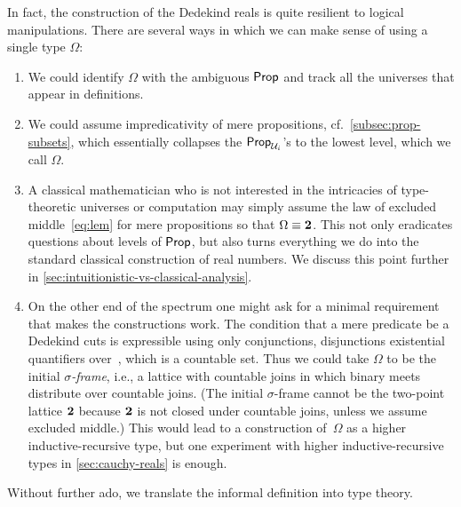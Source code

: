 In fact, the construction of the Dedekind reals is quite resilient to logical
manipulations. There are several ways in which we can make sense of using a single type
$\Omega$:
%
\begin{enumerate}

\item We could identify $\Omega$ with the ambiguous $\mathsf{Prop}$ and track all the universes
  that appear in definitions.

\item We could assume impredicativity of mere propositions, cf.\
  \ref{subsec:prop-subsets}, which essentially collapses the $\mathsf{Prop}_{\mathcal{U}_i}$'s to the
  lowest level, which we call $\Omega$.

\item A classical mathematician who is not interested in the intricacies of type-theoretic
  universes or computation may simply assume the law of excluded middle~\eqref{eq:lem} for
  mere propositions so that $\Omega \equiv \mathbf{2}$. This not only eradicates questions about
  levels of $\mathsf{Prop}$, but also turns everything we do into the standard classical
  construction of real numbers. We discuss this point further in
  \autoref{sec:intuitionistic-vs-classical-analysis}.

\item On the other end of the spectrum one might ask for a minimal requirement that makes
  the constructions work. The condition that a mere predicate be a Dedekind cuts is
  expressible using only conjunctions, disjunctions existential quantifiers over~\Q, which
  is a countable set. Thus we could take $\Omega$ to be the initial \emph{$\sigma$-frame},
  i.e., a lattice with countable joins in which binary meets distribute over countable
  joins. (The initial $\sigma$-frame cannot be the two-point lattice $\mathbf{2}$ because
  $\mathbf{2}$ is not closed under countable joins, unless we assume excluded middle.) This
  would lead to a construction of~$\Omega$ as a higher inductive-recursive type, but one
  experiment with higher inductive-recursive types in \autoref{sec:cauchy-reals} is
  enough.
\end{enumerate}

\noindent
%
Without further ado, we translate the informal definition into type theory.

